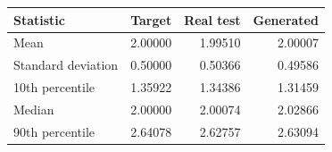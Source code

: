 \begin{tabular}{lrrr}
\toprule
Statistic & Target & Real test & Generated\\
\midrule
Mean & 2.00000 & 1.99510 & 2.00007\\[1.5mm]
Standard deviation & 0.50000 & 0.50366 & 0.49586\\[1.5mm]
10th percentile & 1.35922 & 1.34386 & 1.31459\\[1.5mm]
Median & 2.00000 & 2.00074 & 2.02866\\[1.5mm]
90th percentile & 2.64078 & 2.62757 & 2.63094\\[1.5mm]
\bottomrule
\end{tabular}
